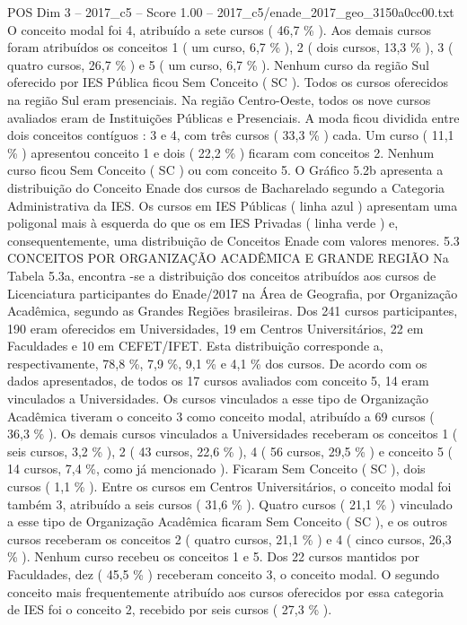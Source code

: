 \begin{textsample}{POS Dim 3 – 2017\_c5 – Score 1.00 – 2017\_c5/enade\_2017\_geo\_3150a0cc00.txt}
O conceito modal foi 4, atribuído a sete cursos ( 46,7 \% ).
Aos demais cursos foram atribuídos os conceitos 1 ( um curso, 6,7 \% ), 2 ( dois cursos, 13,3 \% ), 3 ( quatro cursos, 26,7 \% ) e 5 ( um curso, 6,7 \% ).
Nenhum curso da região Sul oferecido por IES Pública ficou Sem Conceito ( SC ).
Todos os cursos oferecidos na região Sul eram presenciais.
Na região Centro-Oeste, todos os nove cursos avaliados eram de Instituições Públicas e Presenciais.
A moda ficou dividida entre dois conceitos contíguos : 3 e 4, com três cursos ( 33,3 \% ) cada.
Um curso ( 11,1 \% ) apresentou conceito 1 e dois ( 22,2 \% ) ficaram com conceitos 2.
Nenhum curso ficou Sem Conceito ( SC ) ou com conceito 5.
O Gráfico 5.2b apresenta a distribuição do Conceito Enade dos cursos de Bacharelado segundo a Categoria Administrativa da IES.
Os cursos em IES Públicas ( linha azul ) apresentam uma poligonal mais à esquerda do que os em IES Privadas ( linha verde ) e, consequentemente, uma distribuição de Conceitos Enade com valores menores. 5.3 CONCEITOS POR ORGANIZAÇÃO ACADÊMICA E GRANDE REGIÃO Na Tabela 5.3a, encontra -se a distribuição dos conceitos atribuídos aos cursos de Licenciatura participantes do Enade/2017 na Área de Geografia, por Organização Acadêmica, segundo as Grandes Regiões brasileiras.
Dos 241 cursos participantes, 190 eram oferecidos em Universidades, 19 em Centros Universitários, 22 em Faculdades e 10 em CEFET/IFET.
Esta distribuição corresponde a, respectivamente, 78,8 \%, 7,9 \%, 9,1 \% e 4,1 \% dos cursos.
De acordo com os dados apresentados, de todos os 17 cursos avaliados com conceito 5, 14 eram vinculados a Universidades.
Os cursos vinculados a esse tipo de Organização Acadêmica tiveram o conceito 3 como conceito modal, atribuído a 69 cursos ( 36,3 \% ).
Os demais cursos vinculados a Universidades receberam os conceitos 1 ( seis cursos, 3,2 \% ), 2 ( 43 cursos, 22,6 \% ), 4 ( 56 cursos, 29,5 \% ) e conceito 5 ( 14 cursos, 7,4 \%, como já mencionado ).
Ficaram Sem Conceito ( SC ), dois cursos ( 1,1 \% ).
Entre os cursos em Centros Universitários, o conceito modal foi também 3, atribuído a seis cursos ( 31,6 \% ).
Quatro cursos ( 21,1 \% ) vinculado a esse tipo de Organização Acadêmica ficaram Sem Conceito ( SC ), e os outros cursos receberam os conceitos 2 ( quatro cursos, 21,1 \% ) e 4 ( cinco cursos, 26,3 \% ).
Nenhum curso recebeu os conceitos 1 e 5.
Dos 22 cursos mantidos por Faculdades, dez ( 45,5 \% ) receberam conceito 3, o conceito modal.
O segundo conceito mais frequentemente atribuído aos cursos oferecidos por essa categoria de IES foi o conceito 2, recebido por seis cursos ( 27,3 \% ).

\end{textsample}
